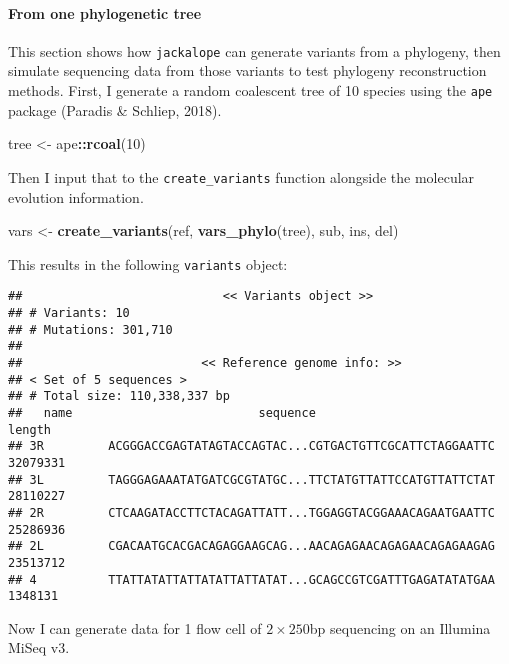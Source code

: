 \documentclass[12pt,]{article}
\newenvironment{Shaded}{\begin{snugshade}}{\end{snugshade}}
\newcommand{\DecValTok}[1]{\textcolor[rgb]{0.00,0.00,0.81}{#1}}
\newcommand{\KeywordTok}[1]{\textcolor[rgb]{0.13,0.29,0.53}{\textbf{#1}}}
\newcommand{\NormalTok}[1]{#1}
\newcommand{\OperatorTok}[1]{\textcolor[rgb]{0.81,0.36,0.00}{\textbf{#1}}}
\newcommand{\StringTok}[1]{\textcolor[rgb]{0.31,0.60,0.02}{#1}}
\let\oldparagraph\paragraph
\renewcommand{\paragraph}[1]{\oldparagraph{#1}\mbox{}}
\begin{document}
\hypertarget{from-one-phylogenetic-tree}{%
\paragraph{From one phylogenetic tree}\label{from-one-phylogenetic-tree}}

This section shows how \texttt{jackalope} can generate variants from a phylogeny, then
simulate sequencing data from those variants to test phylogeny reconstruction methods.
First, I generate a random coalescent tree of 10 species using the \texttt{ape} package
(Paradis \& Schliep, 2018).

\begin{Shaded}
\begin{Highlighting}[]
\NormalTok{tree <-}\StringTok{ }\NormalTok{ape}\OperatorTok{::}\KeywordTok{rcoal}\NormalTok{(}\DecValTok{10}\NormalTok{)}
\end{Highlighting}
\end{Shaded}

Then I input that to the \texttt{create\_variants} function alongside the molecular evolution
information.

\begin{Shaded}
\begin{Highlighting}[]
\NormalTok{vars <-}\StringTok{ }\KeywordTok{create_variants}\NormalTok{(ref,}
                        \KeywordTok{vars_phylo}\NormalTok{(tree),}
\NormalTok{                        sub, ins, del)}
\end{Highlighting}
\end{Shaded}

This results in the following \texttt{variants} object:

\begin{verbatim}
##                            << Variants object >>
## # Variants: 10
## # Mutations: 301,710
## 
##                         << Reference genome info: >>
## < Set of 5 sequences >
## # Total size: 110,338,337 bp
##   name                          sequence                             length
## 3R         ACGGGACCGAGTATAGTACCAGTAC...CGTGACTGTTCGCATTCTAGGAATTC  32079331
## 3L         TAGGGAGAAATATGATCGCGTATGC...TTCTATGTTATTCCATGTTATTCTAT  28110227
## 2R         CTCAAGATACCTTCTACAGATTATT...TGGAGGTACGGAAACAGAATGAATTC  25286936
## 2L         CGACAATGCACGACAGAGGAAGCAG...AACAGAGAACAGAGAACAGAGAAGAG  23513712
## 4          TTATTATATTATTATATTATTATAT...GCAGCCGTCGATTTGAGATATATGAA   1348131
\end{verbatim}

Now I can generate data for 1 flow cell of \(2 \times 250\)bp sequencing
on an Illumina MiSeq v3.
\end{document}
